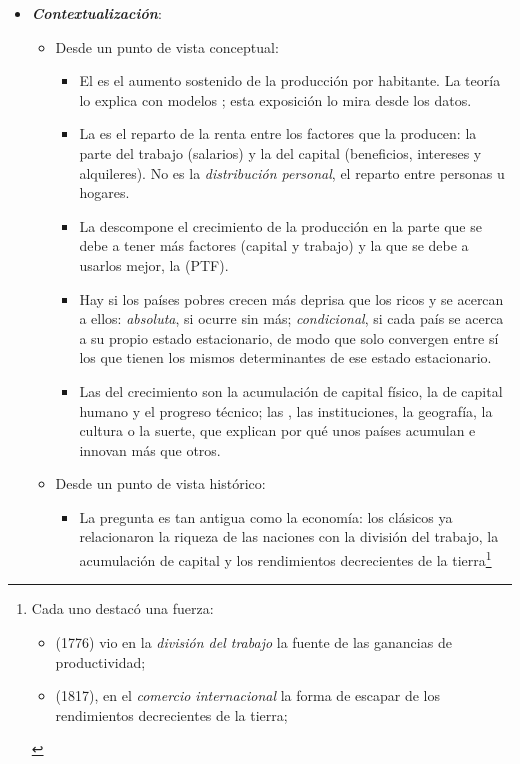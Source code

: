 \documentclass[11pt]{article}
\begin{document}
\begin{itemize}
\item \textbf{\emph{Contextualización}}:
  \begin{itemize}
  \item Desde un punto de vista conceptual:
  \begin{itemize}
  \item El  es el aumento sostenido de la producción por habitante. La teoría lo explica con modelos  ; esta exposición lo mira desde los datos.
  \item La  es el reparto de la renta entre los factores que la producen: la parte del trabajo (salarios) y la del capital (beneficios, intereses y alquileres). No es la \emph{distribución personal}, el reparto entre personas u hogares.
  \item La  descompone el crecimiento de la producción en la parte que se debe a tener más factores (capital y trabajo) y la que se debe a usarlos mejor, la  (PTF).
  \item Hay  si los países pobres crecen más deprisa que los ricos y se acercan a ellos: \emph{absoluta}, si ocurre sin más; \emph{condicional}, si cada país se acerca a su propio estado estacionario, de modo que solo convergen entre sí los que tienen los mismos determinantes de ese estado estacionario.
  \item Las  del crecimiento son la acumulación de capital físico, la de capital humano y el progreso técnico; las , las instituciones, la geografía, la cultura o la suerte, que explican por qué unos países acumulan e innovan más que otros\nocite{Acemoglu2009}.
  \end{itemize}
  \item Desde un punto de vista histórico:
  \begin{itemize}
  \item La pregunta es tan antigua como la economía: los clásicos ya relacionaron la riqueza de las naciones con la división del trabajo, la acumulación de capital y los rendimientos decrecientes de la tierra\footnote{Cada uno destacó una fuerza:
\begin{itemize}
\item {} (1776) vio en la \emph{división del trabajo} la fuente de las ganancias de productividad;
\item {} (1817), en el \emph{comercio internacional} la forma de escapar de los rendimientos decrecientes de la tierra;

\end{itemize}}
\end{itemize}
\end{itemize}
\end{itemize}
\end{document}
